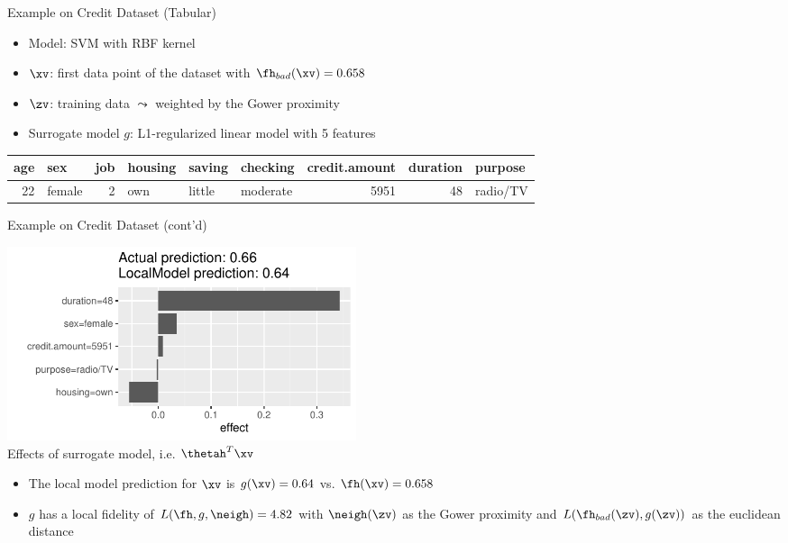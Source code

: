\documentclass[11pt,compress,t,notes=noshow, aspectratio=169, xcolor=table]{beamer}
\newcommand{\pih}{\fh}
\begin{document}
\begin{frame}[c]{Example on Credit Dataset (Tabular)}
	\begin{itemize}
		\item Model: SVM with RBF kernel
		\item $\xv$: first data point of the dataset with $\fh_{bad}(\xv) = 0.658$
		\item $\zv$: training data $\leadsto$ weighted by the Gower proximity 
		\item Surrogate model $g$: L1-regularized linear model with 5 features 
	\end{itemize}

    \bigskip

	\begin{table}[ht]
		\centering
		\scriptsize
		\begin{tabular}{rlrlllrrl}
			\hline
			age & sex & job & housing & saving & checking & credit.amount & duration & purpose \\ 
			\hline
			 22 & female &   2 & own & little & moderate & 5951 &  48 & radio/TV \\ 
			\hline
		\end{tabular}
	\end{table}

\end{frame}

\begin{frame}[c]{Example on Credit Dataset (cont'd)}


\begin{center}
	\includegraphics[width=0.45\textwidth]{figure/lime_credit.pdf}\\
	{Effects of surrogate model, i.e. $\thetah^T \xv$}
\end{center}

\begin{itemize}
	\item The local model prediction for $\xv$ is $g(\xv) = 0.64$ vs. $\fh(\xv) = 0.658$ 
	\item $g$ has a local fidelity of $L(\pih, g, \neigh) = 4.82$ with $\neigh(\zv)$ as the Gower proximity and $L(\pih_{bad}(\zv), g(\zv))$ as the euclidean distance 
\end{itemize}

\end{frame}
	
\end{document}
